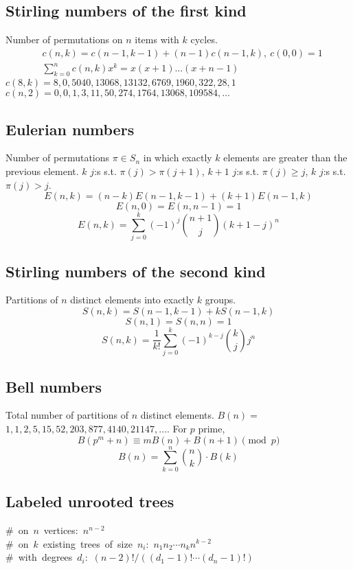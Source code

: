 	\subsection{Stirling numbers of the first kind}
		Number of permutations on $n$ items with $k$ cycles.
		\begin{align*}
			&c(n,k) = c(n-1,k-1) + (n-1) c(n-1,k),\ c(0,0) = 1 \\
			&\textstyle \sum_{k=0}^n c(n,k)x^k = x(x+1) \dots (x+n-1)
		\end{align*}
		$c(8,k) = 8, 0, 5040, 13068, 13132, 6769, 1960, 322, 28, 1$ \\
		$c(n,2) = 0, 0, 1, 3, 11, 50, 274, 1764, 13068, 109584, \dots$

	\subsection{Eulerian numbers}
		Number of permutations $\pi \in S_n$ in which exactly $k$ elements are greater than the previous element. $k$ $j$:s s.t. $\pi(j)>\pi(j+1)$, $k+1$ $j$:s s.t. $\pi(j)\geq j$, $k$ $j$:s s.t. $\pi(j)>j$.
		$$E(n,k) = (n-k)E(n-1,k-1) + (k+1)E(n-1,k)$$
		$$E(n,0) = E(n,n-1) = 1$$
		$$E(n,k) = \sum_{j=0}^k(-1)^j\binom{n+1}{j}(k+1-j)^n$$

	\subsection{Stirling numbers of the second kind}
		Partitions of $n$ distinct elements into exactly $k$ groups.
		$$S(n,k) = S(n-1,k-1) + k S(n-1,k)$$
		$$S(n,1) = S(n,n) = 1$$
		$$S(n,k) = \frac{1}{k!}\sum_{j=0}^k (-1)^{k-j}\binom{k}{j}j^n$$

	\subsection{Bell numbers}
		Total number of partitions of $n$ distinct elements. $B(n) =$
		$1, 1, 2, 5, 15, 52, 203, 877, 4140, 21147, \dots$. For $p$ prime,
		\[ B(p^m+n)\equiv mB(n)+B(n+1) \pmod{p} \]
		$$B(n) = \sum_{k=0}^n \binom{n}{k}\cdot B(k)$$

	\subsection{Labeled unrooted trees}
		\mbox{\# on $n$ vertices: $n^{n-2}$} \\
		\mbox{\# on $k$ existing trees of size $n_i$: $n_1n_2\cdots n_k n^{k-2}$} \\
		\mbox{\# with degrees $d_i$: $(n-2)! / ((d_1-1)! \cdots (d_n-1)!)$}

